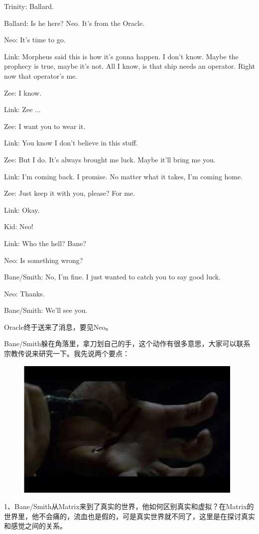 \documentclass[UTF8]{ctexart}
\newenvironment{myquote}{\color{green} \setlength{\leftskip}{6em} \setlength{\rightskip}{4em} \setlength{\parindent}{-2em}}{\par}
\begin{document}
\begin{myquote}
Trinity: Ballard.

Ballard: Is he here? Neo. It's from the Oracle.

Neo: It's time to go.

Link: Morpheus said this is how it's gonna happen. I don't know. Maybe the prophecy is true, maybe it's not. All I know, is that ship needs an operator. Right now that operator's me.

Zee: I know.

Link: Zee ...

Zee: I want you to wear it.

Link: You know I don't believe in this stuff.

Zee: But I do. It's always brought me luck. Maybe it'll bring me you.

Link: I'm coming back. I promise. No matter what it takes, I'm coming home.

Zee: Just keep it with you, please? For me.

Link: Okay.

Kid: Neo!

Link: Who the hell? Bane?

Neo: Is something wrong?

Bane/Smith: No, I'm fine. I just wanted to catch you to say good luck.

Neo: Thanks.

Bane/Smith: We'll see you.
\end{myquote}

Oracle终于送来了消息，要见Neo。

Bane/Smith躲在角落里，拿刀划自己的手，这个动作有很多意思，大家可以联系宗教传说来研究一下。我先说两个要点：

\begin{figure}[htb]
\centering
\includegraphics[width=0.5\linewidth]{fig/read_reloaded-53}
\end{figure}

1、Bane/Smith从Matrix来到了真实的世界，他如何区别真实和虚拟？在Matrix的世界里，他不会痛的，流血也是假的，可是真实世界就不同了，这里是在探讨真实和感觉之间的关系。
\end{document}
